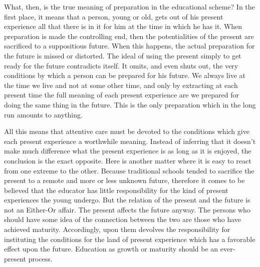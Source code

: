 What, then, is the true meaning of preparation in the educational scheme? In the first 
place, it means that a person, young or old, gets out of his present experience all that 
there is in it for him at the time in which he has it. When preparation is made the 
controlling end, then the potentialities of the present are sacrificed to a suppositious 
future. When this happens, the actual preparation for the future is missed or distorted. 
The ideal of using the present simply to get ready for the future contradicts itself. It 
omits, and even shuts out, the very conditions by which a person can be prepared for his 
future. We always live at the time we live and not at some other time, and only by 
extracting at each present time the full meaning of each present experience are we 
prepared for doing the same thing in the future. This is the only preparation which in the 
long run amounts to anything. 

All this means that attentive care must be devoted to the conditions which give each 
present experience a worthwhile meaning. Instead of inferring that it doesn't make much 
difference what the present experience is as long as it is enjoyed, the conclusion is the 
exact opposite. Here is another matter where it is easy to react from one extreme to the 
other. Because traditional schools tended to sacrifice the present to a remote and more or 
less unknown future, therefore it comes to be believed that the educator has little 
responsibility for the kind of present experiences the young undergo. But the relation of 
the present and the future is not an Either-Or affair. The present affects the future anyway. The persons who should have some idea of the connection between the two are 
those who have achieved maturity. Accordingly, upon them devolves the responsibility 
for instituting the conditions for the land of present experience which has a favorable 
effect upon the future. Education as growth or maturity should be an ever-present 
process. 

